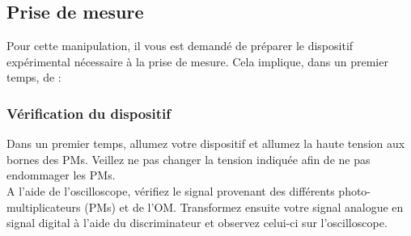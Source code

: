 
\subsection{Prise de mesure}

Pour cette manipulation, il vous est demandé de préparer le dispositif expérimental nécessaire à la prise de mesure. Cela implique, dans un premier temps, de :\\

\begin{center}
\end{center}

\subsubsection{Vérification du dispositif}
Dans un premier temps, allumez votre dispositif et allumez la haute tension aux bornes des PMs. Veillez ne pas changer la tension indiquée afin de ne pas endommager les PMs.\\
A l'aide de l'oscilloscope, vérifiez le signal provenant des différents photo-multiplicateurs (PMs) et de l'OM. Transformez ensuite votre signal analogue en signal digital à l'aide du discriminateur et observez celui-ci sur l'oscilloscope.

